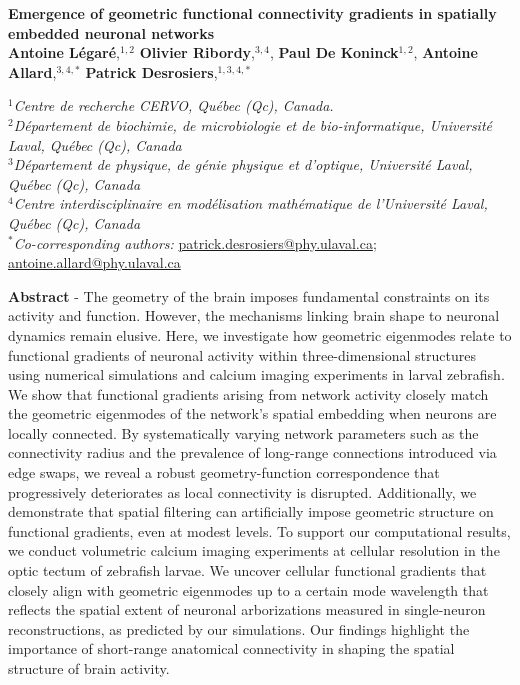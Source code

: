 \documentclass{article}
\begin{document}
\begin{center}

    {\Large \textbf{Emergence of geometric functional connectivity gradients in spatially embedded neuronal networks}}\\
    
    \vspace{10 pt}
    \textbf{Antoine Légaré},$^{1,2}$ \textbf{Olivier Ribordy},$^{3,4}$, \textbf{Paul De Koninck}$^{1,2}$, \textbf{Antoine Allard},$^{3,4,*}$ \textbf{Patrick Desrosiers},$^{1,3,4,*}$ \\
    \vspace{5 pt}
    
    $^1$\textit{Centre de recherche CERVO, Québec (Qc), Canada.}\\
    $^2$\textit{Département de biochimie, de microbiologie et de bio-informatique, Université Laval, Québec (Qc), Canada}\\
    $^3$\textit{D\'epartement de physique, de g\'enie physique et d'optique, Universit\'e Laval, Qu\'ebec (Qc), Canada}\\%
    $^4$\textit{Centre interdisciplinaire en mod\'elisation math\'ematique de l'Universit\'e Laval, Qu\'ebec (Qc), Canada}\\
     $^*$\textit{Co-corresponding authors:} \href{mailto:patrick.desrosiers@phy.ulaval.ca}{patrick.desrosiers@phy.ulaval.ca}; \href{mailto:antoine.allard@nphy.ulaval.ca}{antoine.allard@phy.ulaval.ca}

\end{center}

\vspace{4 pt}

\hrulefill

\textbf{Abstract} - The geometry of the brain imposes fundamental constraints on its activity and function. However, the mechanisms linking brain shape to neuronal dynamics remain elusive. Here, we investigate how geometric eigenmodes relate to functional gradients of neuronal activity within three-dimensional structures using numerical simulations and calcium imaging experiments in larval zebrafish. We show that functional gradients arising from network activity closely match the geometric eigenmodes of the network’s spatial embedding when neurons are locally connected. By systematically varying network parameters such as the connectivity radius and the prevalence of long-range connections introduced via edge swaps, we reveal a robust geometry-function correspondence that progressively deteriorates as local connectivity is disrupted. Additionally, we demonstrate that spatial filtering can artificially impose geometric structure on functional gradients, even at modest levels. To support our computational results, we conduct volumetric calcium imaging experiments at cellular resolution in the optic tectum of zebrafish larvae. We uncover cellular functional gradients that closely align with geometric eigenmodes up to a certain mode wavelength that reflects the spatial extent of neuronal arborizations measured in single-neuron reconstructions, as predicted by our simulations. Our findings highlight the importance of short-range anatomical connectivity in shaping the spatial structure of brain activity.
\end{document}
